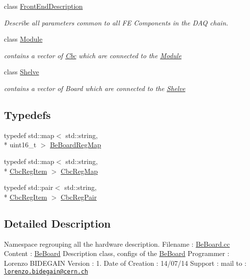 \begin{DoxyCompactItemize}
class \hyperlink{class_ph2___hw_description_1_1_front_end_description}{Front\-End\-Description}
\begin{DoxyCompactList}\small\item\em Describe all parameters common to all F\-E Components in the D\-A\-Q chain. \end{DoxyCompactList}\item 
class \hyperlink{class_ph2___hw_description_1_1_module}{Module}
\begin{DoxyCompactList}\small\item\em contains a vector of \hyperlink{class_ph2___hw_description_1_1_cbc}{Cbc} which are connected to the \hyperlink{class_ph2___hw_description_1_1_module}{Module} \end{DoxyCompactList}\item 
class \hyperlink{class_ph2___hw_description_1_1_shelve}{Shelve}
\begin{DoxyCompactList}\small\item\em contains a vector of Board which are connected to the \hyperlink{class_ph2___hw_description_1_1_shelve}{Shelve} \end{DoxyCompactList}\end{DoxyCompactItemize}
\subsection*{Typedefs}
\begin{DoxyCompactItemize}
\item 
typedef std\-::map$<$ std\-::string, \\*
uint16\-\_\-t $>$ \hyperlink{namespace_ph2___hw_description_a2e13fb82c8ed98154c60f9d0f8467d72}{Be\-Board\-Reg\-Map}
\item 
typedef std\-::map$<$ std\-::string, \\*
\hyperlink{struct_ph2___hw_description_1_1_cbc_reg_item}{Cbc\-Reg\-Item} $>$ \hyperlink{namespace_ph2___hw_description_a9a23b373068f169aa67ca1d22c9a6001}{Cbc\-Reg\-Map}
\item 
typedef std\-::pair$<$ std\-::string, \\*
\hyperlink{struct_ph2___hw_description_1_1_cbc_reg_item}{Cbc\-Reg\-Item} $>$ \hyperlink{namespace_ph2___hw_description_a78856413327152e693dceca249188d11}{Cbc\-Reg\-Pair}
\end{DoxyCompactItemize}


\subsection{Detailed Description}
Namespace regrouping all the hardware description. Filename \-: \hyperlink{_be_board_8cc}{Be\-Board.\-cc} Content \-: \hyperlink{class_ph2___hw_description_1_1_be_board}{Be\-Board} Description class, configs of the \hyperlink{class_ph2___hw_description_1_1_be_board}{Be\-Board} Programmer \-: Lorenzo B\-I\-D\-E\-G\-A\-I\-N Version \-: 1. Date of Creation \-: 14/07/14 Support \-: mail to \-: \href{mailto:lorenzo.bidegain@cern.ch}{\tt lorenzo.\-bidegain@cern.\-ch}

